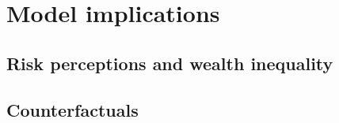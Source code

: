 \hypertarget{experiments}{%
\section{Model implications}\label{experiments}}

\subsection{Risk perceptions and wealth inequality}




\subsection{Counterfactuals}

